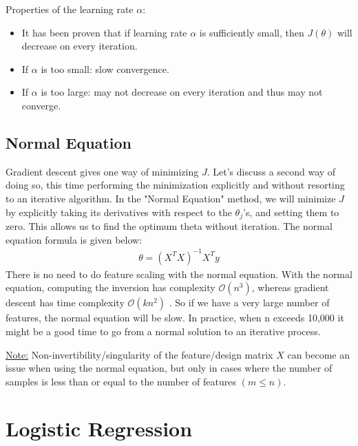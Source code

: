 \documentclass{article}
\begin{document}
            Properties of the learning rate $\alpha$:
            \begin{itemize}
                \item It has been proven that if learning rate $\alpha$ is sufficiently small, then $J(\theta)$ will decrease on every iteration.
                \item If $\alpha$ is too small: slow convergence.
                \item If $\alpha$ is too large: may not decrease on every iteration and thus may not converge.
            \end{itemize}

        \subsection{Normal Equation}

            Gradient descent gives one way of minimizing $J$. Let’s discuss a second way of doing so, this time performing the minimization explicitly and
            without resorting to an iterative algorithm. In the "Normal Equation" method, we will minimize $J$ by explicitly taking its derivatives with 
            respect to the $\theta_j$’s, and setting them to zero. This allows us to find the optimum theta without iteration. The normal equation formula is given below:
            \begin{align*}
                \theta = (X^TX)^{-1}X^Ty
            \end{align*}
            There is no need to do feature scaling with the normal equation. With the normal equation, computing the inversion has complexity 
            $\mathcal{O}(n^3)$, whereas gradient descent has time complexity $\mathcal{O}(kn^2)$ . So if we have a very large number of features, the normal equation will be slow. In practice, when n exceeds 
            10,000 it might be a good time to go from a normal solution to an iterative process.
            \par
            \underline{Note:} Non-invertibility/singularity of the feature/design matrix $X$ can become an issue when using the 
            normal equation, but only in cases where the number of samples is less than or equal to the number of features $(m \leq n)$. 
    
    \section{Logistic Regression}
\end{document}
